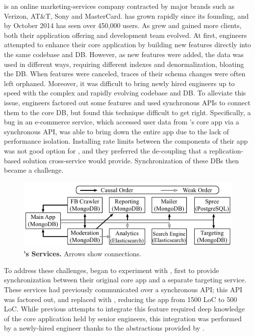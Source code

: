 \crowdtap is an online marketing-services company contracted by major brands such as Verizon, AT\&T, Sony and MasterCard.
\crowdtap has grown rapidly since its founding, and by October 2014 has seen over 450,000 users.
As \crowdtap grew and gained more clients, both their application offering and development team evolved.
At first, engineers attempted to enhance their core application by building new features directly into the same codebase and DB.
However, as new features were added, the data was used in different ways, requiring different indexes and denormalization, bloating the DB.
When features were canceled, traces of their schema changes were often left orphaned.
Moreover, it was difficult to bring newly hired engineers up to speed with the complex and rapidly evolving codebase and DB.
To alleviate this issue, engineers factored out some features and used synchronous APIs to connect them to the core DB, but found this technique difficult to
get right.
Specifically, a bug in an e-commerce service, which accessed user data from
\crowdtap's core app via a synchronous API, was able to bring down the entire app due to
the lack of performance isolation.  Installing rate limits between the components
of their app was not good option for \crowdtap, and they preferred the
de-coupling that a replication-based solution cross-service would provide.
Synchronization of these DBs then became a challenge.

\begin{figure}[t]
  \centering
  \includegraphics[width=\linewidth]{figures/synapse/eco-crowdtap.pdf}
  \caption{{\bf \crowdtap's Services.} Arrows show \synapse connections.}
  \label{synapse:fig:crowdtap-ecosystem}
\end{figure}

To address these challenges, \crowdtap began to experiment with \synapse,
first to provide synchronization between their original core app and a separate
targeting service.  These services had previously communicated over a
synchronous API; this API was factored out, and replaced with \synapse,
reducing the app from 1500 LoC to 500 LoC.  While previous attempts to integrate
this feature required deep knowledge of the core application held by senior
engineers, this integration was performed by a newly-hired engineer thanks to the abstractions provided by \synapse.

